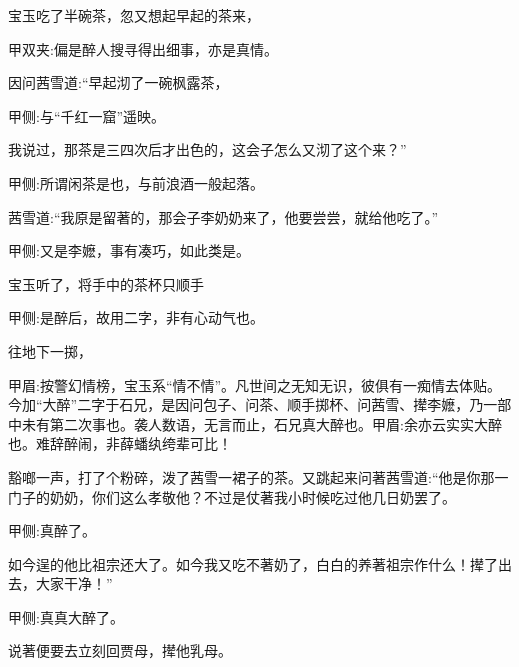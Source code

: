 \begin{parag}
    宝玉吃了半碗茶，忽又想起早起的茶来，\begin{note}甲双夹:偏是醉人搜寻得出细事，亦是真情。\end{note}因问茜雪道:“早起沏了一碗枫露茶，\begin{note}甲侧:与“千红一窟”遥映。\end{note}我说过，那茶是三四次后才出色的，这会子怎么又沏了这个来？”\begin{note}甲侧:所谓闲茶是也，与前浪酒一般起落。\end{note}茜雪道:“我原是留著的，那会子李奶奶来了，他要尝尝，就给他吃了。”\begin{note}甲侧:又是李嬷，事有凑巧，如此类是。\end{note}宝玉听了，将手中的茶杯只顺手\begin{note}甲侧:是醉后，故用二字，非有心动气也。\end{note}往地下一掷，\begin{note}甲眉:按警幻情榜，宝玉系“情不情”。凡世间之无知无识，彼俱有一痴情去体贴。今加“大醉”二字于石兄，是因问包子、问茶、顺手掷杯、问茜雪、撵李嬷，乃一部中未有第二次事也。袭人数语，无言而止，石兄真大醉也。甲眉:余亦云实实大醉也。难辞醉闹，非薛蟠纨绔辈可比！\end{note}豁啷一声，打了个粉碎，泼了茜雪一裙子的茶。又跳起来问著茜雪道:“他是你那一门子的奶奶，你们这么孝敬他？不过是仗著我小时候吃过他几日奶罢了。\begin{note}甲侧:真醉了。\end{note}如今逞的他比祖宗还大了。如今我又吃不著奶了，白白的养著祖宗作什么！撵了出去，大家干净！”\begin{note}甲侧:真真大醉了。\end{note}说著便要去立刻回贾母，撵他乳母。
\end{parag}


